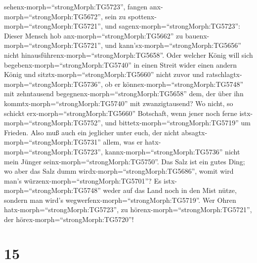 sehenx-morph=``strongMorph:TG5723'', fangen
anx-morph=``strongMorph:TG5672'', sein zu
spottenx-morph=``strongMorph:TG5721'',  und
sagenx-morph=``strongMorph:TG5723'': Dieser Mensch hob
anx-morph=``strongMorph:TG5662'' zu bauenx-morph=``strongMorph:TG5721'',
und kann'sx-morph=``strongMorph:TG5656'' nicht
hinausführenx-morph=``strongMorph:TG5658''.  Oder welcher
König will sich begebenx-morph=``strongMorph:TG5740'' in einen Streit
wider einen andern König und sitztx-morph=``strongMorph:TG5660'' nicht
zuvor und ratschlagtx-morph=``strongMorph:TG5736'', ob er
könnex-morph=``strongMorph:TG5748'' mit zehntausend
begegnenx-morph=``strongMorph:TG5658'' dem, der über ihn
kommtx-morph=``strongMorph:TG5740'' mit zwanzigtausend?  Wo
nicht, so schickt erx-morph=``strongMorph:TG5660'' Botschaft, wenn jener
noch ferne istx-morph=``strongMorph:TG5752'', und
bittetx-morph=``strongMorph:TG5719'' um Frieden.  Also muß
auch ein jeglicher unter euch, der nicht
absagtx-morph=``strongMorph:TG5731'' allem, was er
hatx-morph=``strongMorph:TG5723'', kannx-morph=``strongMorph:TG5736''
nicht mein Jünger seinx-morph=``strongMorph:TG5750''.  Das
Salz ist ein gutes Ding; wo aber das Salz dumm
wirdx-morph=``strongMorph:TG5686'', womit wird man's
würzenx-morph=``strongMorph:TG5701''?  Es
istx-morph=``strongMorph:TG5748'' weder auf das Land noch in den Mist
nütze, sondern man wird's wegwerfenx-morph=``strongMorph:TG5719''. Wer
Ohren hatx-morph=``strongMorph:TG5723'', zu
hörenx-morph=``strongMorph:TG5721'', der
hörex-morph=``strongMorph:TG5720''!

\hypertarget{section-14}{%
\section{15}\label{section-14}}

